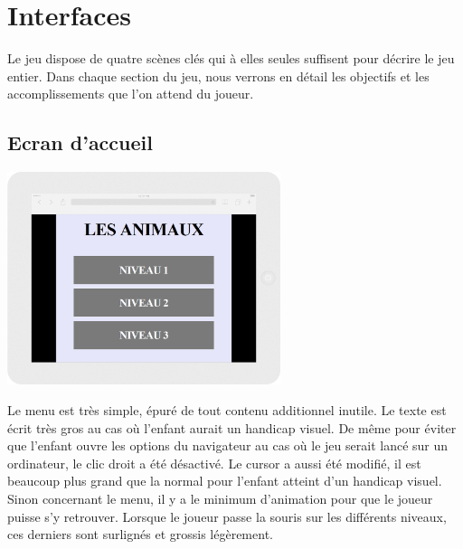 \documentclass{article}
\begin{document}
\section{Interfaces}
\hspace*{0.6cm}Le jeu dispose de quatre sc\`enes cl\'es qui \`a elles seules suffisent pour d\'ecrire le jeu entier. Dans chaque section du jeu, nous verrons en d\'etail les objectifs et les accomplissements que l'on attend du joueur. 
\subsection{Ecran d'accueil}
\vspace{0.5cm}
\begin{center}
\includegraphics[width=0.6\textwidth]{page1}
\end{center}
\vspace{0.5cm}
\hspace*{0.6cm}Le menu est tr\`es simple, \'epur\'e de tout contenu additionnel inutile. Le texte est \'ecrit tr\`es gros au cas o\`u l'enfant aurait un handicap visuel. De m\^eme pour \'eviter que l'enfant ouvre les options du navigateur au cas o\`u le jeu serait lanc\'e sur un ordinateur, le clic droit a \'et\'e d\'esactiv\'e. Le cursor a aussi \'et\'e modifi\'e, il est beaucoup plus grand que la normal pour l'enfant atteint d'un handicap visuel.
\vspace{0.5cm}\\
\hspace*{0.6cm}Sinon concernant le menu, il y a le minimum d'animation pour que le joueur puisse s'y retrouver. Lorsque le joueur passe la souris sur les diff\'erents niveaux, ces derniers sont surlign\'es et grossis l\'eg\`erement.
\end{document}
